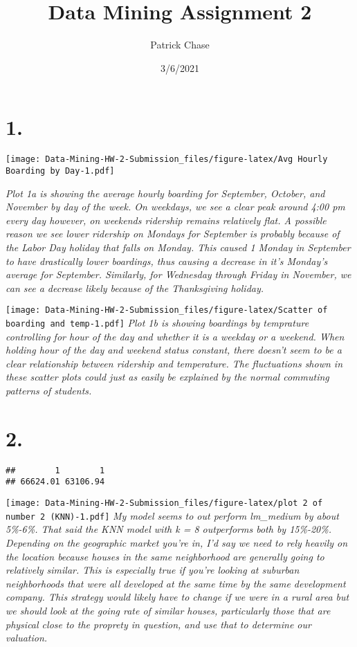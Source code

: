 \documentclass[
]{article}
\title{Data Mining Assignment 2}
\author{Patrick Chase}
\date{3/6/2021}
\begin{document}
\maketitle

\hypertarget{section}{%
\section{1.}\label{section}}

\texttt{[image: Data-Mining-HW-2-Submission\_files/figure-latex/Avg Hourly Boarding by Day-1.pdf]}

\emph{Plot 1a is showing the average hourly boarding for September,
October, and November by day of the week. On weekdays, we see a clear
peak around 4:00 pm every day however, on weekends ridership remains
relatively flat. A possible reason we see lower ridership on Mondays for
September is probably because of the Labor Day holiday that falls on
Monday. This caused 1 Monday in September to have drastically lower
boardings, thus causing a decrease in it's Monday's average for
September. Similarly, for Wednesday through Friday in November, we can
see a decrease likely because of the Thanksgiving holiday.}

\texttt{[image: Data-Mining-HW-2-Submission\_files/figure-latex/Scatter of boarding and temp-1.pdf]}
\emph{Plot 1b is showing boardings by temprature controlling for hour of
the day and whether it is a weekday or a weekend. When holding hour of
the day and weekend status constant, there doesn't seem to be a clear
relationship between ridership and temperature. The fluctuations shown
in these scatter plots could just as easily be explained by the normal
commuting patterns of students.}

\hypertarget{section-1}{%
\section{2.}\label{section-1}}

\begin{verbatim}
##        1        1 
## 66624.01 63106.94
\end{verbatim}

\texttt{[image: Data-Mining-HW-2-Submission\_files/figure-latex/plot 2 of number 2 (KNN)-1.pdf]}
\emph{My model seems to out perform lm\_medium by about 5\%-6\%. That
said the KNN model with k = 8 outperforms both by 15\%-20\%. Depending
on the geographic market you're in, I'd say we need to rely heavily on
the location because houses in the same neighborhood are generally going
to relatively similar. This is especially true if you're looking at
suburban neighborhoods that were all developed at the same time by the
same development company. This strategy would likely have to change if
we were in a rural area but we should look at the going rate of similar
houses, particularly those that are physical close to the proprety in
question, and use that to determine our valuation.}
\end{document}
